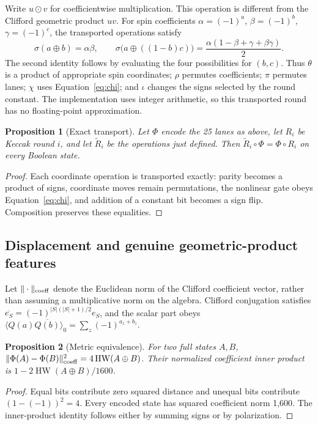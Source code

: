 \documentclass[11pt]{article}
\newtheorem{proposition}{Proposition}
\newcommand{\HW}{\operatorname{HW}}
\begin{document}
Write $u\odot v$ for coefficientwise multiplication. This operation is different from the Clifford geometric product $uv$. For spin coefficients $\alpha=(-1)^a$, $\beta=(-1)^b$, $\gamma=(-1)^c$, the transported operations satisfy
\begin{equation}
\sigma(a\oplus b)=\alpha\beta,\qquad
\sigma\bigl(a\oplus((1-b)c)\bigr)
=\frac{\alpha(1-\beta+\gamma+\beta\gamma)}{2}.
\label{eq:chi}
\end{equation}
The second identity follows by evaluating the four possibilities for $(b,c)$. Thus $\theta$ is a product of appropriate spin coordinates; $\rho$ permutes coefficients; $\pi$ permutes lanes; $\chi$ uses Equation~\eqref{eq:chi}; and $\iota$ changes the signs selected by the round constant. The implementation uses integer arithmetic, so this transported round has no floating-point approximation.

\begin{proposition}[Exact transport]
Let $\Phi$ encode the 25 lanes as above, let $R_i$ be Keccak round $i$, and let $\widetilde R_i$ be the operations just defined. Then $\widetilde R_i\circ\Phi=\Phi\circ R_i$ on every Boolean state.
\end{proposition}
\begin{proof}
Each coordinate operation is transported exactly: parity becomes a product of signs, coordinate moves remain permutations, the nonlinear gate obeys Equation~\eqref{eq:chi}, and addition of a constant bit becomes a sign flip. Composition preserves these equalities.
\end{proof}

\subsection{Displacement and genuine geometric-product features}

Let $\|\cdot\|_{\rm coeff}$ denote the Euclidean norm of the Clifford coefficient vector, rather than assuming a multiplicative norm on the algebra. Clifford conjugation satisfies $\overline{e_S}=(-1)^{|S|(|S|+1)/2}e_S$, and the scalar part obeys $\langle Q(a)\overline{Q(b)}\rangle_0=\sum_z(-1)^{a_z+b_z}$.

\begin{proposition}[Metric equivalence]
For two full states $A,B$, $\|\Phi(A)-\Phi(B)\|_{\rm coeff}^2=4\HW(A\oplus B)$. Their normalized coefficient inner product is $1-2\HW(A\oplus B)/1600$.
\end{proposition}
\begin{proof}
Equal bits contribute zero squared distance and unequal bits contribute $(1-(-1))^2=4$. Every encoded state has squared coefficient norm 1,600. The inner-product identity follows either by summing signs or by polarization.
\end{proof}
\end{document}
